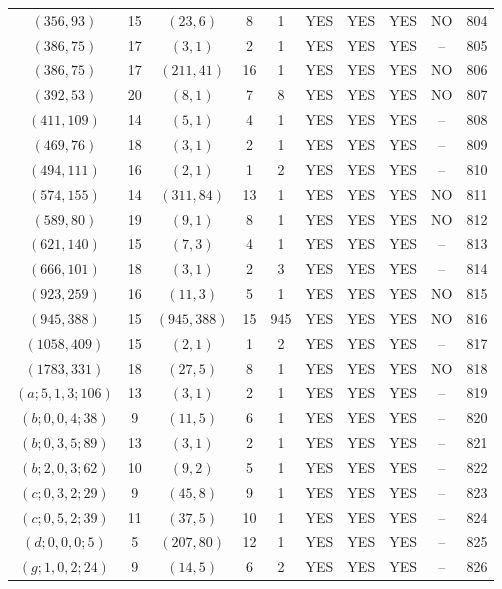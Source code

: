 \begin{longtable}{|c|c|c|c|c|c|c|c|c|c|}
$(356, 93)$ & 15 & $(23, 6)$ & 8 & 1 & YES & YES & YES & NO & 804\\
$(386, 75)$ & 17 & $(3, 1)$ & 2 & 1 & YES & YES & YES & -- & 805\\
$(386, 75)$ & 17 & $(211, 41)$ & 16 & 1 & YES & YES & YES & NO & 806\\
$(392, 53)$ & 20 & $(8, 1)$ & 7 & 8 & YES & YES & YES & NO & 807\\
$(411, 109)$ & 14 & $(5, 1)$ & 4 & 1 & YES & YES & YES & -- & 808\\
$(469, 76)$ & 18 & $(3, 1)$ & 2 & 1 & YES & YES & YES & -- & 809\\
$(494, 111)$ & 16 & $(2, 1)$ & 1 & 2 & YES & YES & YES & -- & 810\\
$(574, 155)$ & 14 & $(311, 84)$ & 13 & 1 & YES & YES & YES & NO & 811\\
$(589, 80)$ & 19 & $(9, 1)$ & 8 & 1 & YES & YES & YES & NO & 812\\
$(621, 140)$ & 15 & $(7, 3)$ & 4 & 1 & YES & YES & YES & -- & 813\\
$(666, 101)$ & 18 & $(3, 1)$ & 2 & 3 & YES & YES & YES & -- & 814\\
$(923, 259)$ & 16 & $(11, 3)$ & 5 & 1 & YES & YES & YES & NO & 815\\
$(945, 388)$ & 15 & $(945, 388)$ & 15 & 945 & YES & YES & YES & NO & 816\\
$(1058, 409)$ & 15 & $(2, 1)$ & 1 & 2 & YES & YES & YES & -- & 817\\
$(1783, 331)$ & 18 & $(27, 5)$ & 8 & 1 & YES & YES & YES & NO & 818\\
$(a; 5, 1, 3; 106)$ & 13 & $(3, 1)$ & 2 & 1 & YES & YES & YES & -- & 819\\
$(b; 0, 0, 4; 38)$ & 9 & $(11, 5)$ & 6 & 1 & YES & YES & YES & -- & 820\\
$(b; 0, 3, 5; 89)$ & 13 & $(3, 1)$ & 2 & 1 & YES & YES & YES & -- & 821\\
$(b; 2, 0, 3; 62)$ & 10 & $(9, 2)$ & 5 & 1 & YES & YES & YES & -- & 822\\
$(c; 0, 3, 2; 29)$ & 9 & $(45, 8)$ & 9 & 1 & YES & YES & YES & -- & 823\\
$(c; 0, 5, 2; 39)$ & 11 & $(37, 5)$ & 10 & 1 & YES & YES & YES & -- & 824\\
$(d; 0, 0, 0; 5)$ & 5 & $(207, 80)$ & 12 & 1 & YES & YES & YES & -- & 825\\
$(g; 1, 0, 2; 24)$ & 9 & $(14, 5)$ & 6 & 2 & YES & YES & YES & -- & 826
\end{longtable}

